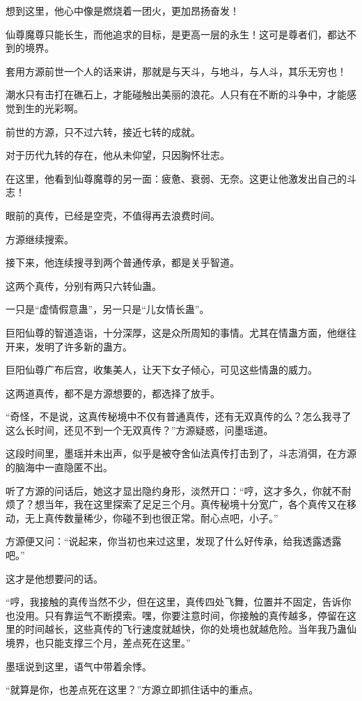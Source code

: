 \begin{this_body}
想到这里，他心中像是燃烧着一团火，更加昂扬奋发！

仙尊魔尊只能长生，而他追求的目标，是更高一层的永生！这可是尊者们，都达不到的境界。

套用方源前世一个人的话来讲，那就是与天斗，与地斗，与人斗，其乐无穷也！

潮水只有击打在礁石上，才能碰触出美丽的浪花。人只有在不断的斗争中，才能感觉到生的光彩啊。

前世的方源，只不过六转，接近七转的成就。

对于历代九转的存在，他从未仰望，只因胸怀壮志。

在这里，他看到仙尊魔尊的另一面：疲惫、衰弱、无奈。这更让他激发出自己的斗志！

眼前的真传，已经是空壳，不值得再去浪费时间。

方源继续搜索。

接下来，他连续搜寻到两个普通传承，都是关乎智道。

这两个真传，分别有两只六转仙蛊。

一只是“虚情假意蛊”，另一只是“儿女情长蛊”。

巨阳仙尊的智道造诣，十分深厚，这是众所周知的事情。尤其在情蛊方面，他继往开来，发明了许多新的蛊方。

巨阳仙尊广布后宫，收集美人，让天下女子倾心，可见这些情蛊的威力。

这两道真传，都不是方源想要的，都选择了放手。

“奇怪，不是说，这真传秘境中不仅有普通真传，还有无双真传的么？怎么我寻了这么长时间，还见不到一个无双真传？”方源疑惑，问墨瑶道。

这段时间里，墨瑶并未出声，似乎是被夺舍仙法真传打击到了，斗志消弭，在方源的脑海中一直隐匿不出。

听了方源的问话后，她这才显出隐约身形，淡然开口：“哼，这才多久，你就不耐烦了？想当年，我在这里探索了足足三个月。真传秘境十分宽广，各个真传又在移动，无上真传数量稀少，你碰不到也很正常。耐心点吧，小子。”

方源便又问：“说起来，你当初也来过这里，发现了什么好传承，给我透露透露吧。”

这才是他想要问的话。

“哼，我接触的真传当然不少，但在这里，真传四处飞舞，位置并不固定，告诉你也没用。只有靠运气不断摸索。嘿，你要注意时间，你接触的真传越多，停留在这里的时间越长，这些真传的飞行速度就越快，你的处境也就越危险。当年我乃蛊仙境界，也只能支撑三个月，差点死在这里。”

墨瑶说到这里，语气中带着余悸。

“就算是你，也差点死在这里？”方源立即抓住话中的重点。


\end{this_body}
